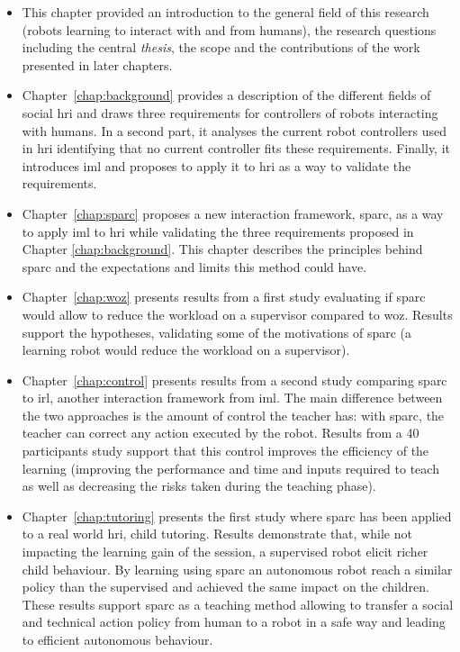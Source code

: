 \begin{itemize}
	\item This chapter provided an introduction to the general field of this research (robots learning to interact with and from humans), the research questions including the central \emph{thesis}, the scope and the contributions of the work presented in later chapters.  

	\item Chapter~\ref{chap:background} provides a description of the different fields of social \gls{hri} and draws three requirements for controllers of robots interacting with humans. In a second part, it analyses the current robot controllers used in \gls{hri} identifying that no current controller fits these requirements. Finally, it introduces \gls{iml} and proposes to apply it to \gls{hri} as a way to validate the requirements.
	
	\item Chapter~\ref{chap:sparc} proposes a new interaction framework, \gls{sparc}, as a way to apply \gls{iml} to \gls{hri} while validating the three requirements proposed in Chapter \ref{chap:background}. This chapter describes the principles behind \gls{sparc} and the expectations and limits this method could have.
	
	\item Chapter~\ref{chap:woz} presents results from a first study evaluating if \gls{sparc} would allow to reduce the workload on a supervisor compared to \gls{woz}. Results support the hypotheses, validating some of the motivations of \gls{sparc} (a learning robot would reduce the workload on a supervisor).
	
	\item Chapter~\ref{chap:control} presents results from a second study comparing \gls{sparc} to \gls{irl}, another interaction framework from \gls{iml}. The main difference between the two approaches is the amount of control the teacher has: with \gls{sparc}, the teacher can correct any action executed by the robot. Results from a 40 participants study support that this control improves the efficiency of the learning (improving the performance and time and inputs required to teach as well as decreasing the risks taken during the teaching phase).
	
	\item Chapter~\ref{chap:tutoring} presents the first study where \gls{sparc} has been applied to a real world \gls{hri}, child tutoring. Results demonstrate that, while not impacting the learning gain of the session, a supervised robot elicit richer child behaviour. By learning using \gls{sparc} an autonomous robot reach a similar policy than the supervised and achieved the same impact on the children. These results support \gls{sparc} as a teaching method allowing to transfer a social and technical action policy from human to a robot in a safe way and leading to efficient autonomous behaviour.
	

\end{itemize}
